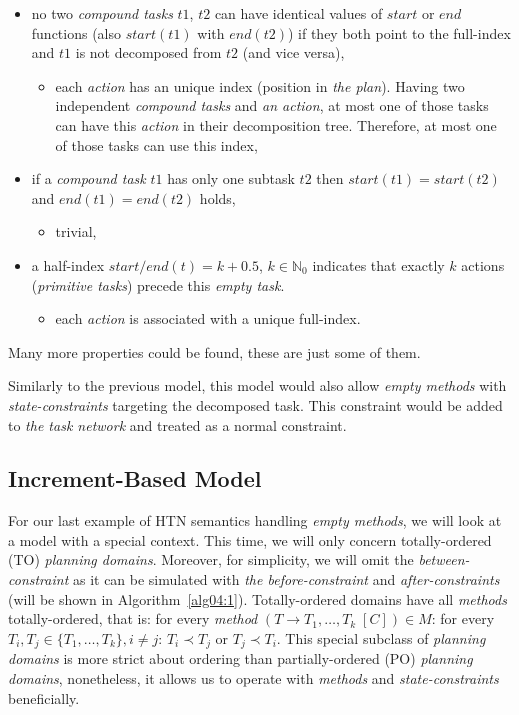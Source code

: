 \begin{itemize}
     \item no two \emph{compound tasks} $t1$, $t2$ can have identical values of $start$ or $end$ functions (also $start(t1)$ with $end(t2)$) if they both point to the full-index and $t1$ is not decomposed from $t2$ (and vice versa),
    \begin{itemize}
        \item each \emph{action} has an unique index (position in \emph{the plan}). Having two independent \emph{compound tasks} and \emph{an action}, at most one of those tasks can have this \emph{action} in their decomposition tree. Therefore, at most one of those tasks can use this index,
    \end{itemize}

    \item if a \emph{compound task} $t1$ has only one subtask $t2$ then $start(t1) = start(t2)$ and $end(t1) = end(t2)$ holds,
    \begin{itemize}
        \item trivial,
    \end{itemize}

    \item a half-index $start/end(t) = k + 0.5$, $k \in \mathbb{N}_0$ indicates that exactly $k$ actions (\emph{primitive tasks}) precede this \emph{empty task}.
    \begin{itemize}
        \item each \emph{action} is associated with a unique full-index.
    \end{itemize}
\end{itemize}

Many more properties could be found, these are just some of them.

\medskip\noindent
Similarly to the previous model, this model would also allow \emph{empty methods} with \emph{state-constraints} targeting the decomposed task. This constraint would be added to \emph{the task network} and treated as a normal constraint.

\subsection{Increment-Based Model}

\medskip\noindent
For our last example of HTN semantics handling \emph{empty methods}, we will look at a model with a special context. This time, we will only concern totally-ordered (TO) \emph{planning domains}. Moreover, for simplicity, we will omit the \emph{between-constraint} as it can be simulated with \emph{the before-constraint} and \emph{after-constraints} (will be shown in Algorithm~\ref{alg04:1}). Totally-ordered domains have all \emph{methods} totally-ordered, that is: for every \emph{method} $(T \rightarrow T_1,\dots, T_k \; [C]) \in M$: for every $T_i, T_j \in \{ T_1, \dots, T_k\}, i \neq j$: $T_i \prec T_j$ or $T_j \prec T_i$. This special subclass of \emph{planning domains} is more strict about ordering than partially-ordered (PO) \emph{planning domains}, nonetheless, it allows us to operate with \emph{methods} and \emph{state-constraints} beneficially. 

